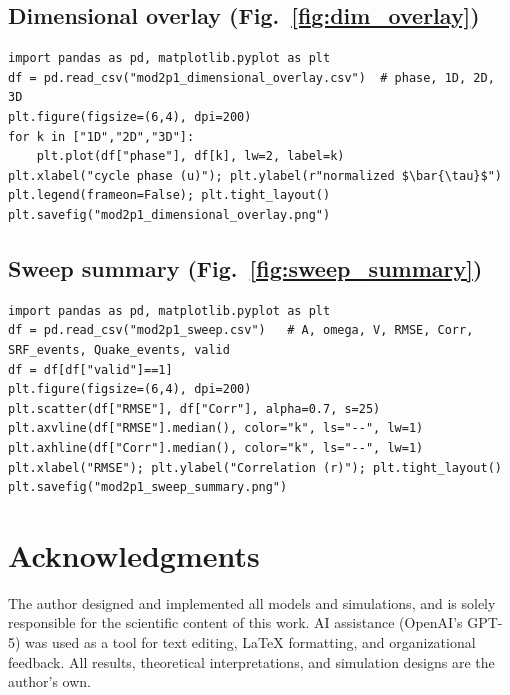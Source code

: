 \documentclass[12pt]{article}
\begin{document}
\subsection{Dimensional overlay (Fig.~\ref{fig:dim_overlay})}
\begin{lstlisting}
import pandas as pd, matplotlib.pyplot as plt
df = pd.read_csv("mod2p1_dimensional_overlay.csv")  # phase, 1D, 2D, 3D
plt.figure(figsize=(6,4), dpi=200)
for k in ["1D","2D","3D"]:
    plt.plot(df["phase"], df[k], lw=2, label=k)
plt.xlabel("cycle phase (u)"); plt.ylabel(r"normalized $\bar{\tau}$")
plt.legend(frameon=False); plt.tight_layout()
plt.savefig("mod2p1_dimensional_overlay.png")
\end{lstlisting}

\subsection{Sweep summary (Fig.~\ref{fig:sweep_summary})}
\begin{lstlisting}
import pandas as pd, matplotlib.pyplot as plt
df = pd.read_csv("mod2p1_sweep.csv")   # A, omega, V, RMSE, Corr, SRF_events, Quake_events, valid
df = df[df["valid"]==1]
plt.figure(figsize=(6,4), dpi=200)
plt.scatter(df["RMSE"], df["Corr"], alpha=0.7, s=25)
plt.axvline(df["RMSE"].median(), color="k", ls="--", lw=1)
plt.axhline(df["Corr"].median(), color="k", ls="--", lw=1)
plt.xlabel("RMSE"); plt.ylabel("Correlation (r)"); plt.tight_layout()
plt.savefig("mod2p1_sweep_summary.png")
\end{lstlisting}
\section*{Acknowledgments}

The author designed and implemented all models and simulations, and is solely
responsible for the scientific content of this work. AI assistance (OpenAI's GPT-5)
was used as a tool for text editing, LaTeX formatting, and organizational feedback.
All results, theoretical interpretations, and simulation designs are the author's own.
\end{document}
